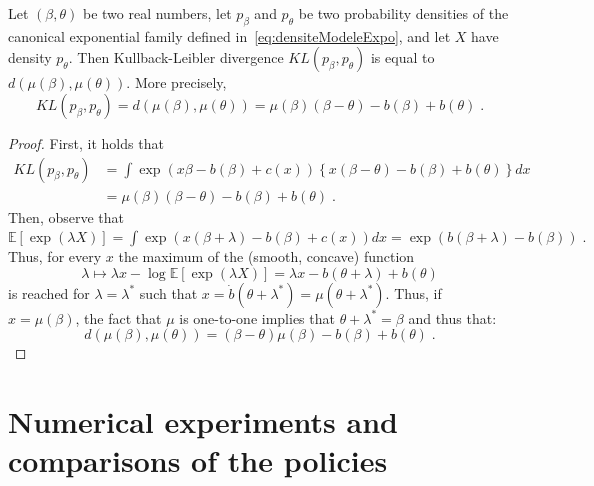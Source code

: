 \documentclass[wcp]{jmlr}
\newcommand{\E}{\mathbb{E}}
\newcommand{\1}{\mathbbm{1}}
\begin{document}
{\begin{lemma}\label{lem:dIsKl}
  Let $(\beta,\theta)$ be two real numbers, let $p_\beta$ and $p_\theta$ be two
  probability densities of the canonical exponential family defined
  in~\eqref{eq:densiteModeleExpo}, and let $X$ have density $p_\theta$.  Then
  Kullback-Leibler divergence $KL(p_\beta, p_\theta)$ is equal to  
  $d(\mu(\beta), \mu(\theta))$. %
  More precisely, 
  \[KL(p_\beta, p_\theta) = d(\mu(\beta), \mu(\theta))  = \mu(\beta)\left( \beta-\theta \right) -b(\beta)+b(\theta)\;.\]
\end{lemma}
\begin{proof}
  First, it holds that
  \begin{align*}
   KL(p_\beta, p_\theta)& = \int \exp\left( x\beta - b(\beta) + c(x) \right)
  \left\{ x\left( \beta-\theta \right) -b(\beta)+b(\theta) \right\} dx \\ 
  &=
  \mu(\beta)\left( \beta-\theta \right) -b(\beta)+b(\theta)\;.   
  \end{align*}
   Then, observe
  that
 $\E\left[ \exp(\lambda X) \right] = \int \exp\left( x(\beta+\lambda) -
    b(\beta) + c(x) \right) dx = \exp( b(\beta+\lambda) - b(\beta))\;.$ 
  Thus,
  for every $x$ the maximum of the (smooth, concave) function
  \[\lambda\mapsto\lambda x - \log\E\left[ \exp(\lambda X) \right] = \lambda x -
  b(\theta+\lambda) + b(\theta)\] is reached for $\lambda=\lambda^*$ such that  $x = \dot{b}(\theta +
  \lambda^*) = \mu(\theta+\lambda^*)$.  Thus, if $x=\mu(\beta)$, the fact that
  $\mu$ is one-to-one implies that $\theta+\lambda^*=\beta$ and thus that:
  \[d(\mu(\beta), \mu(\theta)) = \left( \beta-\theta \right) \mu(\beta) -
  b(\beta) + b(\theta) \;.\]
\end{proof}

\section{Numerical experiments and comparisons of the policies}\label{sec:simu}

}
\end{document}
